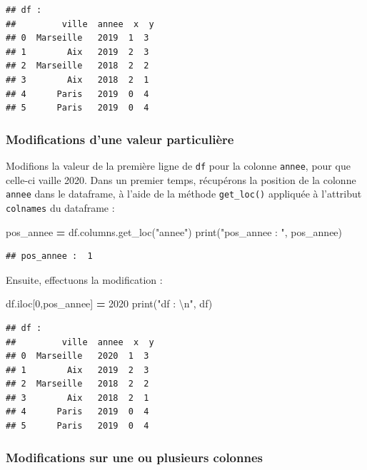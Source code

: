 \documentclass[12pt,]{book}
\newenvironment{Shaded}{\begin{snugshade}}{\end{snugshade}}
\newcommand{\DecValTok}[1]{\textcolor[rgb]{0.00,0.00,0.81}{#1}}
\newcommand{\CharTok}[1]{\textcolor[rgb]{0.31,0.60,0.02}{#1}}
\newcommand{\StringTok}[1]{\textcolor[rgb]{0.31,0.60,0.02}{#1}}
\newcommand{\OperatorTok}[1]{\textcolor[rgb]{0.81,0.36,0.00}{\textbf{#1}}}
\newcommand{\BuiltInTok}[1]{#1}
\newcommand{\NormalTok}[1]{#1}
\numberwithin{equation}{section}
\numberwithin{countremarque}{section}
\begin{document}
\begin{lstlisting}
## df : 
##         ville  annee  x  y
## 0  Marseille   2019  1  3
## 1        Aix   2019  2  3
## 2  Marseille   2018  2  2
## 3        Aix   2018  2  1
## 4      Paris   2019  0  4
## 5      Paris   2019  0  4
\end{lstlisting}

\subsubsection{Modifications d'une valeur
particulière}\label{modifications-dune-valeur-particuliere}

Modifions la valeur de la première ligne de \texttt{df} pour la colonne
\texttt{annee}, pour que celle-ci vaille 2020. Dans un premier temps,
récupérons la position de la colonne \texttt{annee} dans le dataframe, à
l'aide de la méthode \texttt{get\_loc()} appliquée à l'attribut
\texttt{colnames} du dataframe :

\begin{Shaded}
\begin{Highlighting}[]
\NormalTok{pos_annee }\OperatorTok{=}\NormalTok{ df.columns.get_loc(}\StringTok{"annee"}\NormalTok{)}
\BuiltInTok{print}\NormalTok{(}\StringTok{"pos_annee : "}\NormalTok{, pos_annee)}
\end{Highlighting}
\end{Shaded}

\begin{lstlisting}
## pos_annee :  1
\end{lstlisting}

Ensuite, effectuons la modification :

\begin{Shaded}
\begin{Highlighting}[]
\NormalTok{df.iloc[}\DecValTok{0}\NormalTok{,pos_annee] }\OperatorTok{=} \DecValTok{2020}
\BuiltInTok{print}\NormalTok{(}\StringTok{"df : }\CharTok{\textbackslash{}n}\StringTok{"}\NormalTok{, df)}
\end{Highlighting}
\end{Shaded}

\begin{lstlisting}
## df : 
##         ville  annee  x  y
## 0  Marseille   2020  1  3
## 1        Aix   2019  2  3
## 2  Marseille   2018  2  2
## 3        Aix   2018  2  1
## 4      Paris   2019  0  4
## 5      Paris   2019  0  4
\end{lstlisting}

\subsubsection{Modifications sur une ou plusieurs
colonnes}\label{modifications-sur-une-ou-plusieurs-colonnes}
\end{document}
